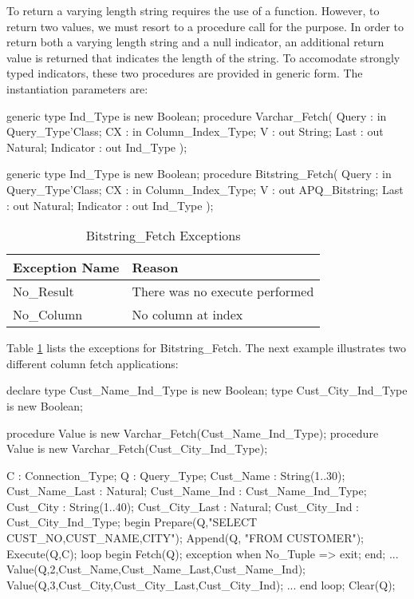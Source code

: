 \documentclass[english,letterpaper]{book}
\begin{document}
To return a varying length string requires
the use of a function. However, to return two values, we must resort
to a procedure call for the purpose. In order to return both a varying
length string and a null indicator, an additional return value is
returned that indicates the length of the string. To accomodate strongly
typed indicators, these two procedures are provided in generic form.
The instantiation parameters are:

\begin{Code}
generic
   type Ind_Type is new Boolean;
procedure Varchar_Fetch(
   Query :     in     Query_Type'Class;
   CX :        in     Column_Index_Type;
   V :            out String;
   Last :         out Natural;
   Indicator :    out Ind_Type
);
\end{Code}

\begin{Code}
generic
   type Ind_Type is new Boolean;
procedure Bitstring_Fetch(
   Query :     in     Query_Type'Class;
   CX :        in     Column_Index_Type;
   V :            out APQ_Bitstring;
   Last :         out Natural;
   Indicator :    out Ind_Type
);
\end{Code}

\begin{table}
   \begin{center}
      \begin{tabular}{ll}
         Exception Name    &  Reason\\
         \hline 
         No\_Result        &  There was no execute performed\\
         No\_Column        &  No column at index\\
      \end{tabular}
   \end{center}
   \caption{Bitstring\_Fetch Exceptions}\label{t:bfx}
\end{table}

Table \ref{t:bfx} lists the exceptions for Bitstring\_Fetch.
The next example illustrates two different column fetch applications:

\begin{Example}
declare
   type Cust_Name_Ind_Type is new Boolean;
   type Cust_City_Ind_Type is new Boolean;

   procedure Value is new 
      Varchar_Fetch(Cust_Name_Ind_Type);
   procedure Value is new 
      Varchar_Fetch(Cust_City_Ind_Type);

   C :              Connection_Type;
   Q :              Query_Type;
   Cust_Name :      String(1..30);
   Cust_Name_Last : Natural;
   Cust_Name_Ind :  Cust_Name_Ind_Type;
   Cust_City :      String(1..40);
   Cust_City_Last : Natural;
   Cust_City_Ind :  Cust_City_Ind_Type;
begin
   Prepare(Q,"SELECT CUST_NO,CUST_NAME,CITY");
   Append(Q, "FROM CUSTOMER");
   Execute(Q,C);
   loop
      begin
         Fetch(Q);
      exception
         when No_Tuple =>
            exit;
      end;
      ...
      Value(Q,2,Cust_Name,Cust_Name_Last,Cust_Name_Ind);
      Value(Q,3,Cust_City,Cust_City_Last,Cust_City_Ind);
      ...
   end loop;
   Clear(Q);
\end{Example}
\end{document}
